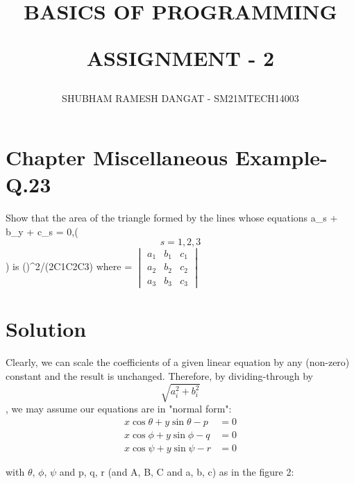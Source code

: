 \documentclass[journal,12pt,twocolumn]{IEEEtran}
\begin{document}
\newcommand{\myvec}[1]{\ensuremath{\begin{pmatrix}#1\end{pmatrix}}}
\newcommand{\cmyvec}[1]{\ensuremath{\begin{pmatrix*}[c]#1\end{pmatrix*}}}
\providecommand{\norm}[1]{\lVert#1\rVert}
\newcommand{\mydet}[1]{\ensuremath{\begin{vmatrix}#1\end{vmatrix}}}
\newcommand{\proj}[2]{\textbf{proj}_{\vec{#1}}\vec{#2}}
\newcommand{\abs}[1]{\left\lvert#1\right\rvert}
\newcommand{\RNum}[1]{\uppercase\expandafter{\romannumeral #1\relax}}
\newcommand{\Rnum}[1]{\lowercase\expandafter{\romannumeral #1\relax}}
\let\StandardTheFigure\thefigure
\let\vec\mathbf

\title{
BASICS OF PROGRAMMING

ASSIGNMENT - 2
}
\author{ SHUBHAM RAMESH DANGAT - SM21MTECH14003}
\maketitle
\newpage
\bigskip
\renewcommand{\thefigure}{\theenumi}

\section*{ Chapter \RNum{3} Miscellaneous Example-\RNum{6} Q.23}

Show that the area of the triangle formed by the lines whose equations a_s + b_y + c_s = 0,($$ s=1,2,3 $$) is (\Delta)^2/(2C1C2C3)
where \Delta = \mydet{
 a_1 & b_1 & c_1  \\ 
 a_2 & b_2 & c_2  \\
 a_3 & b_3 & c_3 
}
\section*{\textbf{Solution}}
\noindent
Clearly, we can scale the coefficients of a given linear equation by any (non-zero) constant and the result is unchanged. Therefore, by dividing-through by  $$\sqrt{a_i^2+b_i^2}$$ , we may assume our equations are in "normal form":
\begin{align}
x \cos\theta + y \sin\theta - p &= 0 \\
x \cos\phi + y \sin\phi - q &= 0 \\
x \cos\psi + y \sin\psi - r &= 0
\end{align}

with $\theta$, $\phi$, $\psi$ and p, q, r (and A, B, C and a, b, c) as in the figure 2:
\end{document}
